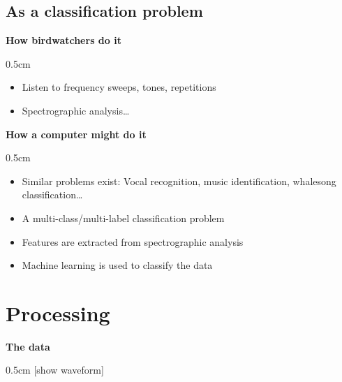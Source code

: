 \documentclass[t, xcolor={dvipsnames}]{beamer}
\begin{document}

\subsection{As a classification problem}

\begin{frame}[fragile]
  \vspace{0.5cm}
  {\bfseries\Large How birdwatchers do it}\\
  \vspace{0.5cm}
  \begin{addmargin}{0.5cm}
    \begin{itemize}
      \item Listen to frequency sweeps, tones, repetitions
      \item Spectrographic analysis\ldots
    \end{itemize}
  \end{addmargin}
  \vspace{0.5cm}
  {\bfseries\Large How a computer might do it}\\
  \vspace{0.5cm}
  \begin{addmargin}{0.5cm}
    \begin{itemize}
      \item Similar problems exist: Vocal recognition, music identification, whalesong classification\ldots
      \item A multi-class/multi-label classification problem
      \item Features are extracted from spectrographic analysis
      \item Machine learning is used to classify the data
    \end{itemize}
  \end{addmargin}
\end{frame}


\section{Processing}

\begin{frame}[fragile]
  \vspace{0.5cm}
  {\bfseries\Large The data}
  \vspace{0.5cm}
  \begin{addmargin}{0.5cm}
    [show waveform]
  \end{addmargin}
\end{frame}
\end{document}
